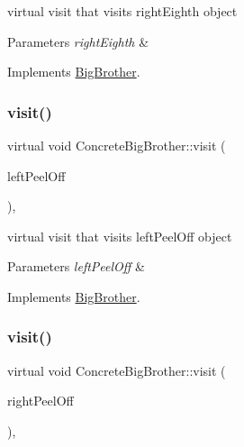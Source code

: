 virtual visit that visits right\+Eighth object 
\begin{DoxyParams}{Parameters}
{\em right\+Eighth} & \\
\hline
\end{DoxyParams}


Implements \mbox{\hyperlink{class_big_brother_a99a50a1db4244d77dd3dcaa9fdbd7946}{Big\+Brother}}.

\mbox{\label{class_concrete_big_brother_ab74422b56214550d74c956f408960d87}} 
\subsubsection{\texorpdfstring{visit()}{visit()}\hspace{0.1cm}{\footnotesize\ttfamily [3/7]}}
{\footnotesize\ttfamily virtual void Concrete\+Big\+Brother\+::visit (\begin{DoxyParamCaption}\item[{\mbox{\hyperlink{class_left_peel_off}{Left\+Peel\+Off}} $\ast$}]{left\+Peel\+Off }\end{DoxyParamCaption})\hspace{0.3cm}{\ttfamily [inline]}, {\ttfamily [virtual]}}

virtual visit that visits left\+Peel\+Off object 
\begin{DoxyParams}{Parameters}
{\em left\+Peel\+Off} & \\
\hline
\end{DoxyParams}


Implements \mbox{\hyperlink{class_big_brother_abcc93629cd4baa43ed2c729dcc97f080}{Big\+Brother}}.

\mbox{\label{class_concrete_big_brother_a972dde2c8065422c01a323b010f4ffdf}} 
\subsubsection{\texorpdfstring{visit()}{visit()}\hspace{0.1cm}{\footnotesize\ttfamily [4/7]}}
{\footnotesize\ttfamily virtual void Concrete\+Big\+Brother\+::visit (\begin{DoxyParamCaption}\item[{\mbox{\hyperlink{class_right_peel_off}{Right\+Peel\+Off}} $\ast$}]{right\+Peel\+Off }\end{DoxyParamCaption})\hspace{0.3cm}{\ttfamily [inline]}, {\ttfamily [virtual]}}


